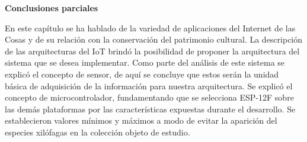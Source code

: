 
    \textbf{\large Conclusiones parciales}

    En este capítulo se ha hablado de la variedad de aplicaciones del Internet de las Cosas y de su relación con la conservación del patrimonio cultural. La descripción de las arquitecturas del IoT brindó la posibilidad de proponer la arquitectura del sistema que se desea implementar. Como parte del análisis de este sistema se explicó el concepto de sensor, de aquí se concluye que estos serán la unidad básica de adquisición de la información para nuestra arquitectura.
    Se explicó el concepto de microcontrolador, fundamentando que se selecciona ESP-12F sobre las demás plataformas por las características expuestas durante el desarrollo. 
    Se establecieron valores mínimos y máximos a modo de evitar la aparición del especies xilófagas en la colección objeto de estudio.